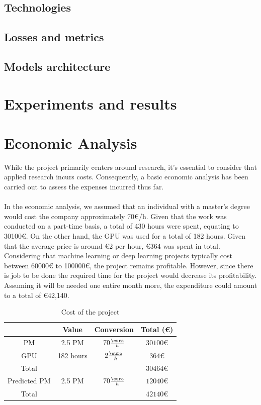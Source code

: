 \documentclass[11pt, a4paper]{article}
\begin{document}
	\subsection{Technologies}
	
	\subsection{Losses and metrics}
	
	\subsection{Models architecture}
	
	\section{Experiments and results}
	
	\section*{Economic Analysis}
	While the project primarily centers around research, it's essential to consider that applied research incurs costs. Consequently, a basic economic analysis has been carried out to assess the expenses incurred thus far.\\
	\\
	In the economic analysis, we assumed that an individual with a master's degree would cost the company approximately 70€/h. Given that the work was conducted on a part-time basis, a total of 430 hours were spent, equating to 30100€. 
	On the other hand, the GPU was used for a total of 182 hours. Given that the average price is around €2 \cite{price-gpu} per hour, €364 was spent in total. Considering that machine learning or deep learning projects typically cost between 60000€ to 100000€, the project remains profitable. However, since there is job to be done the required time for the project would decrease its profitability. Assuming it will be needed one entire month more, the expenditure could amount to a total of €42,140.
	\begin{table}[H]
		\centering
		\caption{Cost of the project}
		\begin{tabular}{c|ccc}
		 & Value & Conversion & Total (\euro) \\\hline
		PM	& 2.5 PM & $70 \frac{\text{\euro}}{h}$ & $30100 €$ \\
		GPU	& 182 hours & $2 \frac{\text{\euro}}{h}$ & $364 €$ \\\hline
		Total & & & $30464 €$\\\hline\hline
		Predicted PM & 2.5 PM & $70 \frac{\text{\euro}}{h}$ & $12040 €$\\\hline
		Total & & & $42140 €$\\	
		\end{tabular}
	\end{table}
	
\end{document}
